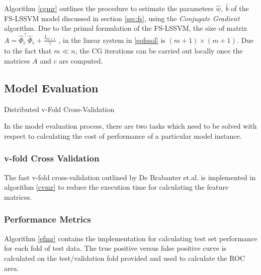 Algorithm \ref{cgmr} outlines the procedure to estimate the parameters $\hat{w},\ \hat{b}$ of the FS-LSSVM model discussed in section \ref{sec:fs}, using the \textit{Conjugate Gradient} algorithm. Due to the primal formulation of the FS-LSSVM, the size of matrix $A =  \hat{\Phi}^{\intercal}_e \hat{\Phi}_e + \frac{\mathit{I}_{m+1}}{\gamma}$ , in the linear system in \eqref{eqfssol} is $(m+1) \times (m+1)$. Due to the fact that $m \ll n$, the CG iterations can be carried out locally once the matrices $A$ and $c$ are computed.

\subsection*{Model Evaluation}

\begin{algorithm}[!ht]\label{cvmr}
    \DontPrintSemicolon
    
\caption{Distributed v-Fold Cross-Validation}
\end{algorithm}

In the model evaluation process, there are two tasks which need to be solved with respect to calculating the cost of performance of a particular model instance.

\subsubsection*{v-fold Cross Validation}
The fast v-fold cross-validation outlined by De Brabanter et.al. \cite{DeBrabanter2010} is implemented in algorithm \ref{cvmr} to reduce the execution time for calculating the feature matrices.


\subsubsection*{Performance Metrics}
Algorithm \ref{efmr} contains the implementation for calculating test set performance for each fold of test data. The true positive versus false positive curve is calculated on the test/validation fold provided and used to calculate the ROC area.

